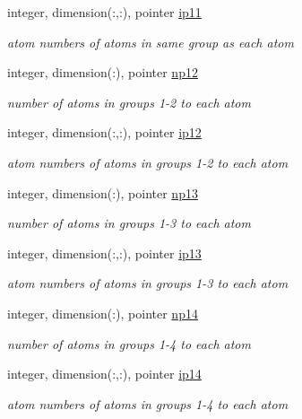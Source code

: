 \begin{DoxyCompactItemize}
integer, dimension(\-:,\-:), pointer \hyperlink{classpolgrp_aa9a2a7c09067a53711bea451e5d3d8c1}{ip11}
\begin{DoxyCompactList}\small\item\em atom numbers of atoms in same group as each atom \end{DoxyCompactList}\item 
integer, dimension(\-:), pointer \hyperlink{classpolgrp_a18263501dbc8502c7daaaaeb6de004fc}{np12}
\begin{DoxyCompactList}\small\item\em number of atoms in groups 1-\/2 to each atom \end{DoxyCompactList}\item 
integer, dimension(\-:,\-:), pointer \hyperlink{classpolgrp_a68d24ef189679ee0f25e0d5dfb471b62}{ip12}
\begin{DoxyCompactList}\small\item\em atom numbers of atoms in groups 1-\/2 to each atom \end{DoxyCompactList}\item 
integer, dimension(\-:), pointer \hyperlink{classpolgrp_a1b59e6c5e0f2d496d3c5610650dd4f4a}{np13}
\begin{DoxyCompactList}\small\item\em number of atoms in groups 1-\/3 to each atom \end{DoxyCompactList}\item 
integer, dimension(\-:,\-:), pointer \hyperlink{classpolgrp_a4e5e6905b4a0a09de1543cf4dc28e641}{ip13}
\begin{DoxyCompactList}\small\item\em atom numbers of atoms in groups 1-\/3 to each atom \end{DoxyCompactList}\item 
integer, dimension(\-:), pointer \hyperlink{classpolgrp_a850234d75a00647d662c56c2da9cc3a1}{np14}
\begin{DoxyCompactList}\small\item\em number of atoms in groups 1-\/4 to each atom \end{DoxyCompactList}\item 
integer, dimension(\-:,\-:), pointer \hyperlink{classpolgrp_a253a7d7e48f57b4f2c9f1680ab1dc309}{ip14}
\begin{DoxyCompactList}\small\item\em atom numbers of atoms in groups 1-\/4 to each atom \end{DoxyCompactList}\end{DoxyCompactItemize}


